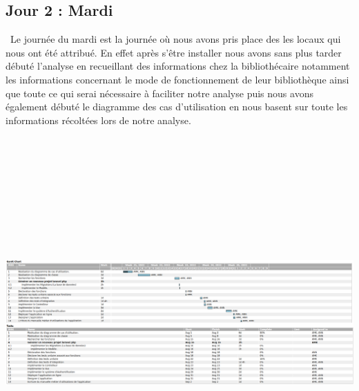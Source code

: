 \documentclass[12pt,a4paper]{article}
\begin{document}
\newpage
\subsection{Jour 2 : Mardi}
\ Le journée du mardi est la journée où nous avons pris place des les locaux qui nous ont été attribué. En effet après s’être installer nous avons sans plus tarder débuté l’analyse en recueillant des informations chez la bibliothécaire notamment les informations concernant le mode de fonctionnement de leur bibliothèque ainsi que toute ce qui serai nécessaire à faciliter notre analyse puis nous avons également débuté le diagramme des cas d’utilisation en nous basent sur toute les informations récoltées lors de notre analyse.\\
\includegraphics[height=15cm,width=22cm]{images/jour2.png}
\end{document}

